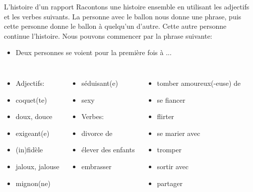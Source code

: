 \begin{frame}{L'histoire d'un rapport}
  Racontons une histoire ensemble en utilisant les adjectifs et les verbes suivants.
  La personne avec le ballon nous donne une phrase, puis cette personne donne le ballon à quelqu'un d'autre.
  Cette autre personne continue l'histoire.
  Nous pouvons commencer par la phrase suivante:
  \begin{itemize}
    \item Deux personnes se voient pour la première fois à ...
  \end{itemize}
  \begin{columns}[t]
      \begin{itemize}
        \item[] \alert{Adjectifs:}
        \item coquet(te)
        \item doux, douce
        \item exigeant(e)
        \item (in)fidèle
        \item jaloux, jalouse
        \item mignon(ne)
      \end{itemize}
      \begin{itemize}
        \item séduisant(e)
        \item sexy
        \item[] \alert{Verbes:}
        \item divorce de
        \item élever des enfants
        \item embrasser
      \end{itemize}
      \begin{itemize}
        \item tomber amoureux(-euse) de
        \item se fiancer
        \item flirter
        \item se marier avec
        \item tromper
        \item sortir avec
        \item partager
      \end{itemize}
  \end{columns}
\end{frame}